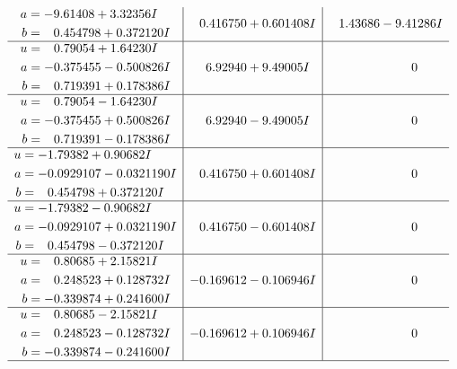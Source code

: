 \documentclass[1p]{elsarticle_modified}
\theoremstyle{definition}
\begin{document}
$$\begin{array}{c|c|c}
\begin{aligned}
a &= -9.61408 + 3.32356 I \\
b &= \phantom{-}0.454798 + 0.372120 I\end{aligned}
 & \phantom{-}0.416750 + 0.601408 I & \phantom{-}1.43686 - 9.41286 I \\ \hline\begin{aligned}
u &= \phantom{-}0.79054 + 1.64230 I \\
a &= -0.375455 - 0.500826 I \\
b &= \phantom{-}0.719391 + 0.178386 I\end{aligned}
 & \phantom{-}6.92940 + 9.49005 I & \phantom{-0.000000 } 0 \\ \hline\begin{aligned}
u &= \phantom{-}0.79054 - 1.64230 I \\
a &= -0.375455 + 0.500826 I \\
b &= \phantom{-}0.719391 - 0.178386 I\end{aligned}
 & \phantom{-}6.92940 - 9.49005 I & \phantom{-0.000000 } 0 \\ \hline\begin{aligned}
u &= -1.79382 + 0.90682 I \\
a &= -0.0929107 - 0.0321190 I \\
b &= \phantom{-}0.454798 + 0.372120 I\end{aligned}
 & \phantom{-}0.416750 + 0.601408 I & \phantom{-0.000000 } 0 \\ \hline\begin{aligned}
u &= -1.79382 - 0.90682 I \\
a &= -0.0929107 + 0.0321190 I \\
b &= \phantom{-}0.454798 - 0.372120 I\end{aligned}
 & \phantom{-}0.416750 - 0.601408 I & \phantom{-0.000000 } 0 \\ \hline\begin{aligned}
u &= \phantom{-}0.80685 + 2.15821 I \\
a &= \phantom{-}0.248523 + 0.128732 I \\
b &= -0.339874 + 0.241600 I\end{aligned}
 & -0.169612 - 0.106946 I & \phantom{-0.000000 } 0 \\ \hline\begin{aligned}
u &= \phantom{-}0.80685 - 2.15821 I \\
a &= \phantom{-}0.248523 - 0.128732 I \\
b &= -0.339874 - 0.241600 I\end{aligned}
 & -0.169612 + 0.106946 I & \phantom{-0.000000 } 0\\
 \hline 
 \end{array}$$\newpage\newpage\renewcommand{\arraystretch}{1}
\end{document}
